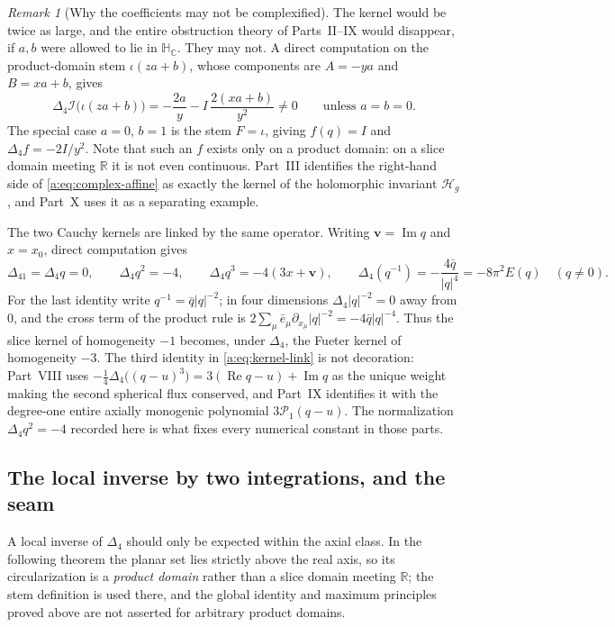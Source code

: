 \documentclass[11pt,a4paper]{article}
\numberwithin{equation}{section}
\theoremstyle{definition}
\theoremstyle{remark}
\newtheorem{remark}[theorem]{Remark}
\theoremstyle{plain}
\newcommand{\HC}{\mathbb H_{\mathbb C}}
\newcommand{\RR}{\mathbb R}
\DeclareMathOperator{\Rea}{Re}
\DeclareMathOperator{\Ima}{Im}
\newcommand{\lap}{\Delta_4}
\newcommand{\I}{\mathcal I}
\newcommand{\Hg}{\mathcal H_{g}}      %
\newcommand{\abs}[1]{\lvert #1\rvert}
\begin{document}
\begin{remark}[Why the coefficients may not be complexified]
\label{a:rem:complex-affine}
The kernel would be twice as large, and the entire obstruction theory of
Parts~II--IX would disappear, if $a,b$ were allowed to lie in $\HC$. They may
not. A direct computation on the product-domain stem $\iota(za+b)$, whose
components are $A=-ya$ and $B=xa+b$, gives
\begin{equation}
 \lap\I\bigl(\iota(za+b)\bigr)=-\frac{2a}{y}-I\,\frac{2(xa+b)}{y^2}\ne0
 \qquad\text{unless }a=b=0 .
 \label{a:eq:complex-affine}
\end{equation}
The special case $a=0$, $b=1$ is the stem $F=\iota$, giving $f(q)=I$ and
$\lap f=-2I/y^2$. Note that such an $f$ exists only on a product domain: on a
slice domain meeting $\RR$ it is not even continuous. Part~III identifies the
right-hand side of \eqref{a:eq:complex-affine} as exactly the kernel of the
holomorphic invariant $\Hg$, and Part~X uses it as a separating example.
\end{remark}

The two Cauchy kernels are linked by the same operator. Writing
$\mathbf v=\Ima q$ and $x=x_0$, direct computation gives
\begin{equation}
 \lap1=\lap q=0,\qquad
 \lap q^2=-4,\qquad
 \lap q^3=-4(3x+\mathbf v),\qquad
 \lap(q^{-1})=-\frac{4\bar q}{\abs q^4}=-8\pi^2E(q)\quad(q\ne0).
 \label{a:eq:kernel-link}
\end{equation}
For the last identity write $q^{-1}=\bar q\abs q^{-2}$; in four dimensions
$\lap\abs q^{-2}=0$ away from $0$, and the cross term of the product rule is
$2\sum_\mu\bar e_\mu\partial_{x_\mu}\abs q^{-2}=-4\bar q\abs q^{-4}$. Thus the
slice kernel of homogeneity $-1$ becomes, under $\lap$, the Fueter kernel of
homogeneity $-3$. The third identity in \eqref{a:eq:kernel-link} is not
decoration: Part~VIII uses $-\tfrac14\lap\bigl((q-u)^3\bigr)=3(\Rea q-u)
+\Ima q$ as the unique weight making the second spherical flux conserved, and
Part~IX identifies it with the degree-one entire axially monogenic polynomial
$3\mathcal P_1(q-u)$. The normalization $\lap q^2=-4$ recorded here is what
fixes every numerical constant in those parts.

\subsection{The local inverse by two integrations, and the seam}
\label{a:sec:local-inverse}

A local inverse of $\lap$ should only be expected within the axial class. In
the following theorem the planar set lies strictly above the real axis, so its
circularization is a \emph{product domain} rather than a slice domain meeting
$\RR$; the stem definition is used there, and the global identity and maximum
principles proved above are not asserted for arbitrary product domains.
\end{document}
